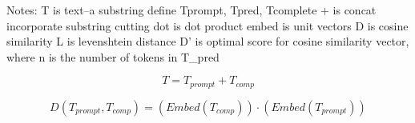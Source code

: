 \documentclass{article}
\begin{document}
Notes: 
\newline T is text--a substring
\newline define Tprompt, Tpred, Tcomplete
\newline+ is concat
\newline incorporate substring cutting
\newline dot is dot product
\newline embed is unit vectors
\newline D is cosine similarity
\newline L is levenshtein distance
\newline D' is optimal score for cosine similarity vector, where n is the number of tokens in T\_{pred}

\begin{equation}
    T= T_{prompt}+T_{comp}
\end{equation}


\begin{equation}     
    D(T_{prompt},T_{comp})= (Embed(T_{comp})) \cdot (Embed(T_{prompt}))
\end{equation}
\end{document}
